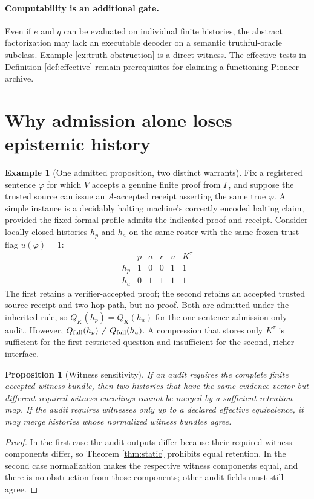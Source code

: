 \documentclass[11pt,letterpaper]{article}
\newtheorem{proposition}[theorem]{Proposition}
\theoremstyle{definition}
\newtheorem{example}[theorem]{Example}
\begin{document}
\paragraph{Computability is an additional gate.} Even if $e$ and $q$ can be evaluated on individual finite histories, the abstract factorization may lack an executable decoder on a semantic truthful-oracle subclass. Example \ref{ex:truth-obstruction} is a direct witness. The effective tests in Definition \ref{def:effective} remain prerequisites for claiming a functioning Pioneer archive.

\section{Why admission alone loses epistemic history}
\begin{example}[One admitted proposition, two distinct warrants]\label{ex:proof-vs-att}
Fix a registered sentence $\varphi$ for which $V$ accepts a genuine finite proof from $\Gamma$, and suppose the trusted source can issue an $A$-accepted receipt asserting the same true $\varphi$. A simple instance is a decidably halting machine's correctly encoded halting claim, provided the fixed formal profile admits the indicated proof and receipt. Consider locally closed histories $h_p$ and $h_a$ on the same roster with the same frozen trust flag $u(\varphi)=1$:
\[
\begin{array}{c|cccc|c}
& p&a&r&u&K^\tau\\\hline
h_p&1&0&0&1&1\\
h_a&0&1&1&1&1
\end{array}
\]
The first retains a verifier-accepted proof; the second retains an accepted trusted source receipt and two-hop path, but no proof. Both are admitted under the inherited rule, so $Q_K(h_p)=Q_K(h_a)$ for the one-sentence admission-only audit. However, $Q_{\rm full}(h_p)\ne Q_{\rm full}(h_a)$. A compression that stores only $K^\tau$ is sufficient for the first restricted question and insufficient for the second, richer interface.
\end{example}

\begin{proposition}[Witness sensitivity]\label{prop:witness}
If an audit requires the complete finite accepted witness bundle, then two histories that have the same evidence vector but different required witness encodings cannot be merged by a sufficient retention map. If the audit requires witnesses only up to a declared effective equivalence, it may merge histories whose normalized witness bundles agree.
\end{proposition}
\begin{proof}
In the first case the audit outputs differ because their required witness components differ, so Theorem \ref{thm:static} prohibits equal retention. In the second case normalization makes the respective witness components equal, and there is no obstruction from those components; other audit fields must still agree.
\end{proof}
\end{document}
